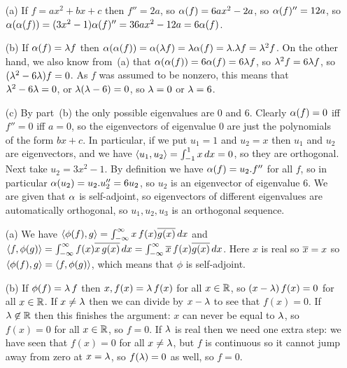  \begin{itemize}
  \item[(a)] If $f=ax^2+bx+c$ then $f''=2a$, so $\alpha(f)=6ax^2-2a$, so
   $\alpha(f)''=12a$, so
   $\alpha(\alpha(f))=(3x^2-1)\alpha(f)''=36ax^2-12a=6\alpha(f)$.
  \item[(b)] If $\alpha(f)=\lambda f$ then
   $\alpha(\alpha(f))=\alpha(\lambda f)=\lambda\alpha(f)=\lambda.\lambda f=\lambda^2 f$.  On the other
   hand, we also know from~(a) that $\alpha(\alpha(f))=6\alpha(f)=6\lambda f$, so
   $\lambda^2 f=6\lambda f$, so $(\lambda^2-6\lambda)f=0$.  As $f$ was assumed to be
   nonzero, this means that $\lambda^2-6\lambda=0$, or $\lambda(\lambda-6)=0$, so
   $\lambda=0$ or $\lambda=6$.
  \item[(c)] By part~(b) the only possible eigenvalues are $0$ and
   $6$.  Clearly $\alpha(f)=0$ iff $f''=0$ iff $a=0$, so the eigenvectors
   of eigenvalue $0$ are just the polynomials of the form $bx+c$.
   In particular, if we put $u_1=1$ and $u_2=x$ then $u_1$ and $u_2$
   are eigenvectors, and we have $\langle u_1,u_2\rangle=\int_{-1}^1 x\,dx=0$,
   so they are orthogonal.  Next take $u_2=3x^2-1$.  By definition
   we have $\alpha(f)=u_2.f''$ for all $f$, so in particular
   $\alpha(u_2)=u_2.u_2''=6u_2$, so $u_2$ is an eigenvector of eigenvalue
   $6$.  We are given that $\alpha$ is self-adjoint, so eigenvectors of
   different eigenvalues are automatically orthogonal, so
   $u_1,u_2,u_3$ is an orthogonal sequence.
 \end{itemize}
\EndDeferredSolution

 \begin{itemize}
  \item[(a)] We have
   $\langle \phi(f),g\rangle=\int_{-\infty}^\infty x\,f(x)\overline{g(x)}\,dx$ and
   $\langle f,\phi(g)\rangle=\int_{-\infty}^\infty f(x)\overline{x\,g(x)}\,dx=
   \int_{-\infty}^\infty \overline{x}\,f(x)\overline{g(x)}\,dx$.  Here $x$ is real
   so $\overline{x}=x$ so $\langle \phi(f),g\rangle=\langle f,\phi(g)\rangle$, which means that
   $\phi$ is self-adjoint.
  \item[(b)] If $\phi(f)=\lambda\,f$ then $x,f(x)=\lambda\,f(x)$ for all
   $x\in{\mathbb{R}}$, so $(x-\lambda)\,f(x)=0$ for all $x\in{\mathbb{R}}$.  If $x\neq\lambda$
   then we can divide by $x-\lambda$ to see that $f(x)=0$.  If
   $\lambda\not\in{\mathbb{R}}$ then this finishes the argument: $x$ can never be
   equal to $\lambda$, so $f(x)=0$ for all $x\in{\mathbb{R}}$, so $f=0$.  If $\lambda$
   is real then we need one extra step: we have seen that $f(x)=0$ for
   all $x\neq\lambda$, but $f$ is continuous so it cannot jump away from
   zero at $x=\lambda$, so $f(\lambda)=0$ as well, so $f=0$.
 \end{itemize}
\EndDeferredSolution

